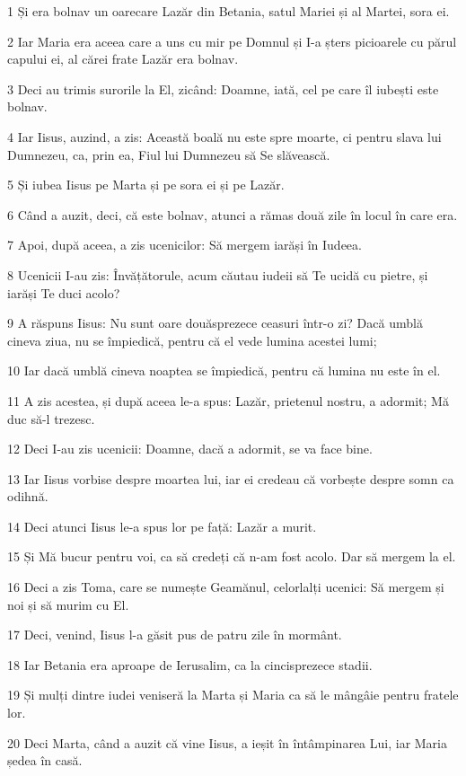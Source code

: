 \par 1 Și era bolnav un oarecare Lazăr din Betania, satul Mariei și al Martei, sora ei.
\par 2 Iar Maria era aceea care a uns cu mir pe Domnul și I-a șters picioarele cu părul capului ei, al cărei frate Lazăr era bolnav.
\par 3 Deci au trimis surorile la El, zicând: Doamne, iată, cel pe care îl iubești este bolnav.
\par 4 Iar Iisus, auzind, a zis: Această boală nu este spre moarte, ci pentru slava lui Dumnezeu, ca, prin ea, Fiul lui Dumnezeu să Se slăvească.
\par 5 Și iubea Iisus pe Marta și pe sora ei și pe Lazăr.
\par 6 Când a auzit, deci, că este bolnav, atunci a rămas două zile în locul în care era.
\par 7 Apoi, după aceea, a zis ucenicilor: Să mergem iarăși în Iudeea.
\par 8 Ucenicii I-au zis: Învățătorule, acum căutau iudeii să Te ucidă cu pietre, și iarăși Te duci acolo?
\par 9 A răspuns Iisus: Nu sunt oare douăsprezece ceasuri într-o zi? Dacă umblă cineva ziua, nu se împiedică, pentru că el vede lumina acestei lumi;
\par 10 Iar dacă umblă cineva noaptea se împiedică, pentru că lumina nu este în el.
\par 11 A zis acestea, și după aceea le-a spus: Lazăr, prietenul nostru, a adormit; Mă duc să-l trezesc.
\par 12 Deci I-au zis ucenicii: Doamne, dacă a adormit, se va face bine.
\par 13 Iar Iisus vorbise despre moartea lui, iar ei credeau că vorbește despre somn ca odihnă.
\par 14 Deci atunci Iisus le-a spus lor pe față: Lazăr a murit.
\par 15 Și Mă bucur pentru voi, ca să credeți că n-am fost acolo. Dar să mergem la el.
\par 16 Deci a zis Toma, care se numește Geamănul, celorlalți ucenici: Să mergem și noi și să murim cu El.
\par 17 Deci, venind, Iisus l-a găsit pus de patru zile în mormânt.
\par 18 Iar Betania era aproape de Ierusalim, ca la cincisprezece stadii.
\par 19 Și mulți dintre iudei veniseră la Marta și Maria ca să le mângâie pentru fratele lor.
\par 20 Deci Marta, când a auzit că vine Iisus, a ieșit în întâmpinarea Lui, iar Maria ședea în casă.
